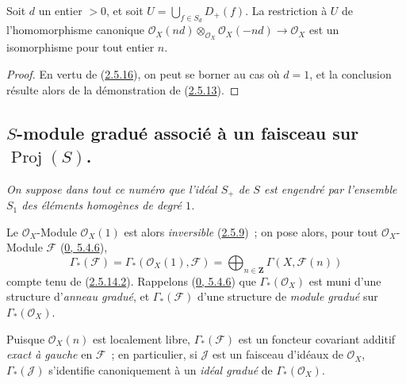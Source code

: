 \begin{proposition}[2.5.17]
\label{II.2.5.17-fr}
Soit $d$ un entier $>0$, et soit
$U=\bigcup_{f\in S_d}D_+(f)$. La restriction à $U$ de l'homomorphisme
canonique
$\mathcal{O}_X(nd)\otimes_{\mathcal{O}_X}\mathcal{O}_X(-nd)
\to\mathcal{O}_X$ est un isomorphisme pour tout entier $n$.
\end{proposition}

\begin{proof}
En vertu de (\hyperref[II.2.5.16-fr]{2.5.16}), on peut se borner au cas où
$d=1$, et la conclusion résulte alors de la démonstration de
(\hyperref[II.2.5.13-fr]{2.5.13}).
\end{proof}

\subsection{$S$-module gradué associé à un faisceau sur
$\operatorname{Proj}(S)$.}
\label{subsection:II.2.6-fr}

\emph{On suppose dans tout ce numéro que l'idéal $S_+$ de $S$ est engendré
par l'ensemble $S_1$ des éléments homogènes de degré $1$.}

\begin{env}[2.6.1]
\label{II.2.6.1-fr}
Le $\mathcal{O}_X$-Module $\mathcal{O}_X(1)$ est alors
\emph{inversible} (\hyperref[II.2.5.9-fr]{2.5.9})~; on pose alors, pour tout
$\mathcal{O}_X$-Module $\mathcal{F}$
(\hyperref[0.5.4.6-fr]{0, 5.4.6}),
\[
\label{II.2.6.1.1-fr}
  \Gamma_*(\mathcal{F})
  =\Gamma_*(\mathcal{O}_X(1),\mathcal{F})
  =\bigoplus_{n\in\mathbf{Z}}\Gamma(X,\mathcal{F}(n))
\tag{2.6.1.1}
\]
compte tenu de (\hyperref[II.2.5.14.2-fr]{2.5.14.2}). Rappelons
(\hyperref[0.5.4.6-fr]{0, 5.4.6}) que $\Gamma_*(\mathcal{O}_X)$ est muni
d'une structure d'\emph{anneau gradué}, et $\Gamma_*(\mathcal{F})$ d'une
structure de
\emph{module gradué} sur $\Gamma_*(\mathcal{O}_X)$.

Puisque $\mathcal{O}_X(n)$ est localement libre, $\Gamma_*(\mathcal{F})$
est un foncteur covariant additif
\emph{exact à gauche} en $\mathcal{F}$~; en particulier, si $\mathcal{J}$
est un faisceau d'idéaux de $\mathcal{O}_X$, $\Gamma_*(\mathcal{J})$
s'identifie canoniquement à un
\emph{idéal gradué} de $\Gamma_*(\mathcal{O}_X)$.
\end{env}

